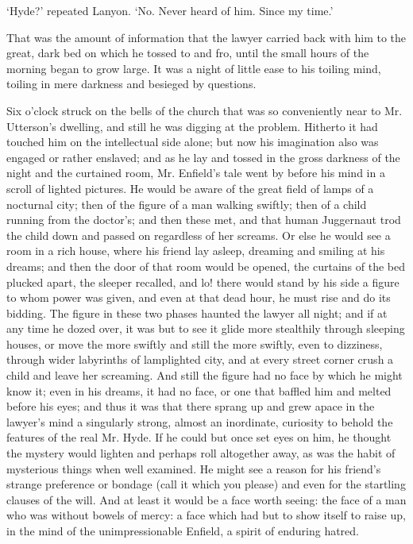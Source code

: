 \documentclass[]{novel}
\begin{document}
‘Hyde?’ repeated Lanyon. ‘No. Never heard of him. Since my time.’

That was the amount of information that the lawyer carried back with him to the great, dark bed on which he tossed to and fro, until the small hours of the morning began to grow large. It was a night of little ease to his toiling mind, toiling in mere darkness and besieged by questions.

Six o’clock struck on the bells of the church that was so conveniently near to Mr. Utterson’s dwelling, and still he was digging at the problem. Hitherto it had touched him on the intellectual side alone; but now his imagination also was engaged or rather enslaved; and as he lay and tossed in the gross darkness of the night and the curtained room, Mr. Enfield’s tale went by before his mind in a scroll of lighted pictures. He would be aware of the great field of lamps of a nocturnal city; then of the figure of a man walking swiftly; then of a child running from the doctor’s; and then these met, and that human Juggernaut trod the child down and passed on regardless of her screams. Or else he would see a room in a rich house, where his friend lay asleep, dreaming and smiling at his dreams; and then the door of that room would be opened, the curtains of the bed plucked apart, the sleeper recalled, and lo! there would stand by his side a figure to whom power was given, and even at that dead hour, he must rise and do its bidding. The figure in these two phases haunted the lawyer all night; and if at any time he dozed over, it was but to see it glide more stealthily through sleeping houses, or move the more swiftly and still the more swiftly, even to dizziness, through wider labyrinths of lamplighted city, and at every street corner crush a child and leave her screaming. And still the figure had no face by which he might know it; even in his dreams, it had no face, or one that baffled him and melted before his eyes; and thus it was that there sprang up and grew apace in the lawyer’s mind a singularly strong, almost an inordinate, curiosity to behold the features of the real Mr. Hyde. If he could but once set eyes on him, he thought the mystery would lighten and perhaps roll altogether away, as was the habit of mysterious things when well examined. He might see a reason for his friend’s strange preference or bondage (call it which you please) and even for the startling clauses of the will. And at least it would be a face worth seeing: the face of a man who was without bowels of mercy: a face which had but to show itself to raise up, in the mind of the unimpressionable Enfield, a spirit of enduring hatred.
\end{document}
